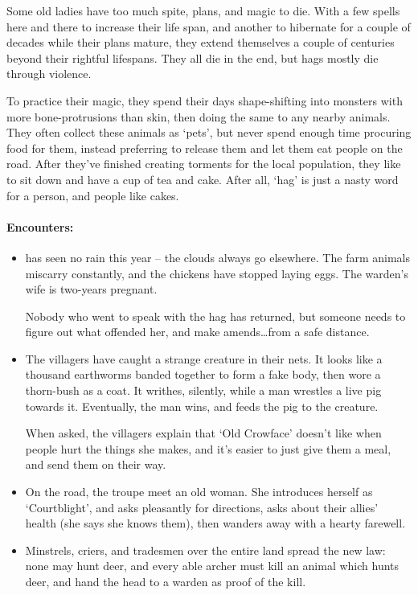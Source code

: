 \begin{multicols}{2}

\noindent
Some old ladies have too much spite, plans, and magic to die.
With a few spells here and there to increase their life span, and another to hibernate for a couple of decades while their plans mature, they extend themselves a couple of centuries beyond their rightful lifespans.
They all die in the end, but hags mostly die through violence.

To practice their magic, they spend their days shape-shifting into monsters with more bone-protrusions than skin, then doing the same to any nearby animals.
They often collect these animals as `pets', but never spend enough time procuring food for them, instead preferring to release them and let them eat people on the road.
After they've finished creating torments for the local population, they like to sit down and have a cup of tea and cake.
After all, `hag' is just a nasty word for a person, and people like cakes.

\paragraph{Encounters:}

\begin{itemize}
  \item
   has seen no rain this year -- the clouds always go elsewhere.
  The farm animals miscarry constantly, and the chickens have stopped laying eggs.
  The warden's wife is two-years pregnant.

  Nobody who went to speak with the hag has returned, but someone needs to figure out what offended her, and make amends\ldots from a safe distance.
  \item
  The villagers have caught a strange creature in their nets.
  It looks like a thousand earthworms banded together to form a fake body, then wore a thorn-bush as a coat.
  It writhes, silently, while a man wrestles a live pig towards it.
  Eventually, the man wins, and feeds the pig to the creature.

  When asked, the villagers explain that `Old Crowface' doesn't like when people hurt the things she makes, and it's easier to just give them a meal, and send them on their way.
  \item
  On the road, the troupe meet an old woman.
  She introduces herself as `Courtblight', and asks pleasantly for directions, asks about their allies' health (she says she knows them), then wanders away with a hearty farewell.
  \item
  Minstrels, criers, and tradesmen over the entire land spread the new law: none may hunt deer, and every able archer must kill an animal which hunts deer, and hand the head to a warden as proof of the kill.


\end{itemize}
\end{multicols}
